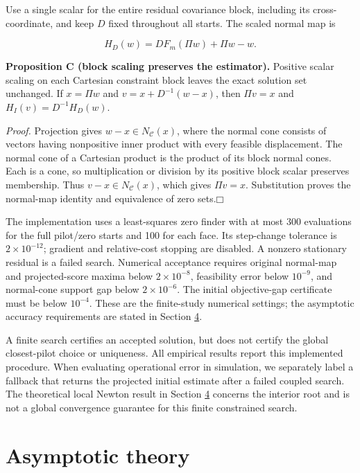 \documentclass[11pt]{article}
\providecommand{\square}{\mdlgwhtsquare}
\begin{document}
Use a single scalar for the entire residual covariance block, including its cross-coordinate, and keep \(D\) fixed throughout all starts. The scaled normal map is

\begin{equation*}
H_D(w)=D F_m(\Pi w)+\Pi w-w.\tag{39}\label{eq:39}
\end{equation*}

\label{res:Proposition-C}
\textbf{Proposition C (block scaling preserves the estimator).} Positive scalar scaling on each Cartesian constraint block leaves the exact solution set unchanged. If \(x=\Pi w\) and \(v=x+D^{-1}(w-x)\), then \(\Pi v=x\) and \(H_I(v)=D^{-1}H_D(w)\).

\emph{Proof.} Projection gives \(w-x\in N_{\mathcal C}(x)\), where the normal cone consists of vectors having nonpositive inner product with every feasible displacement. The normal cone of a Cartesian product is the product of its block normal cones. Each is a cone, so multiplication or division by its positive block scalar preserves membership. Thus \(v-x\in N_{\mathcal C}(x)\), which gives \(\Pi v=x\). Substitution proves the normal-map identity and equivalence of zero sets.\hfill$\square$

The implementation uses a least-squares zero finder with at most 300 evaluations for the full pilot/zero starts and 100 for each face. Its step-change tolerance is \(2\times10^{-12}\); gradient and relative-cost stopping are disabled. A nonzero stationary residual is a failed search. Numerical acceptance requires original normal-map and projected-score maxima below \(2\times10^{-8}\), feasibility error below \(10^{-9}\), and normal-cone support gap below \(2\times10^{-6}\). The initial objective-gap certificate must be below \(10^{-4}\). These are the finite-study numerical settings; the asymptotic accuracy requirements are stated in Section \hyperref[sec:4]{4}.

A finite search certifies an accepted solution, but does not certify the global closest-pilot choice or uniqueness. All empirical results report this implemented procedure. When evaluating operational error in simulation, we separately label a fallback that returns the projected initial estimate after a failed coupled search. The theoretical local Newton result in Section \hyperref[sec:4]{4} concerns the interior root and is not a global convergence guarantee for this finite constrained search.

\section{Asymptotic theory}\label{sec:4}
\end{document}
